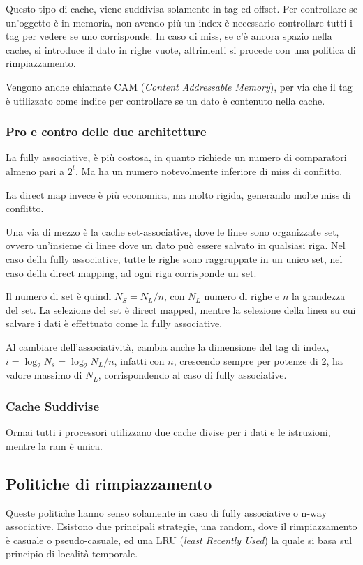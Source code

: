 \documentclass[../template]{subfiles}
\begin{document}
Questo tipo di cache, viene suddivisa solamente in tag ed offset. Per controllare se un'oggetto è in memoria, non avendo più un index è necessario controllare tutti i tag per vedere se uno corrisponde. In caso di miss, se c'è ancora spazio nella cache, si introduce il dato in righe vuote, altrimenti si procede con una politica di rimpiazzamento.

Vengono anche chiamate CAM (\textit{Content Addressable Memory}), per via che il tag è utilizzato come indice per controllare se un dato è contenuto nella cache.

\subsubsection{Pro e contro delle due architetture}
La fully associative, è più costosa, in quanto richiede un numero di comparatori almeno pari a $2^t$. Ma ha un numero notevolmente inferiore di miss di conflitto.

La direct map invece è più economica, ma molto rigida, generando molte miss di conflitto.

Una via di mezzo è la cache set-associative, dove le linee sono organizzate set, ovvero un'insieme di linee dove un dato può essere salvato in qualsiasi riga.
Nel caso della fully associative, tutte le righe sono raggruppate in un unico set, nel caso della direct mapping, ad ogni riga corrisponde un set.

Il numero di set è quindi $N_S = N_L / n$, con $N_L$ numero di righe e $n$ la grandezza del set. La selezione del set è direct mapped, mentre la selezione della linea su cui salvare i dati è effettuato come la fully associative.

Al cambiare dell'associatività, cambia anche la dimensione del tag di index, $i = \log_2 N_s = \log_2 N_L / n$, infatti con $n$, crescendo sempre per potenze di 2, ha valore massimo di $N_L$, corrispondendo al caso di fully associative.

\subsubsection{Cache Suddivise}
Ormai tutti i processori utilizzano due cache divise per i dati e le istruzioni, mentre la ram è unica.

\subsection{Politiche di rimpiazzamento}
Queste politiche hanno senso solamente in caso di fully associative o n-way associative.
Esistono due principali strategie, una random, dove il rimpiazzamento è casuale o pseudo-casuale, ed una LRU (\textit{least Recently Used}) la quale si basa sul principio di località temporale.
\end{document}
